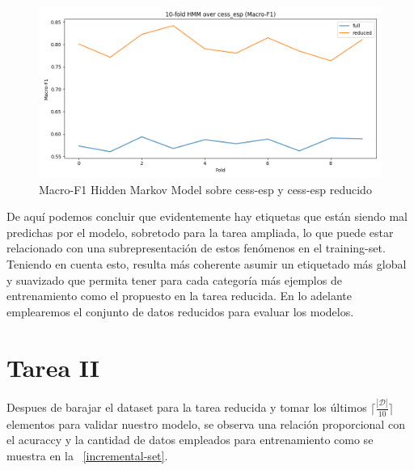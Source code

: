 \documentclass[11pt,a4paper]{report}
\begin{document}
	\begin{figure}[!thb]
		\begin{center}
			\includegraphics[scale=0.6]{images/macro-f1-hmm.png}
		\end{center}
		\caption{Macro-F1 Hidden Markov Model sobre cess-esp y cess-esp reducido}
		\label{macro-f1-hmm}
	\end{figure}

	De aquí podemos concluir que evidentemente hay etiquetas que están siendo mal predichas por el modelo, sobretodo para la tarea ampliada, lo que puede estar relacionado con una subrepresentación de estos fenómenos en el training-set. Teniendo en cuenta esto, resulta más coherente asumir un etiquetado más global y suavizado que permita tener para cada categoría más ejemplos de entrenamiento como el propuesto en la tarea reducida. En lo adelante emplearemos el conjunto de datos reducidos para evaluar los modelos.
	
	\section*{Tarea II}
	
	Despues de barajar el dataset para la tarea reducida y tomar los últimos $\Big\lceil \frac{|\mathcal{D}|}{10}\Big\rceil$ elementos para validar nuestro modelo, se observa una relación proporcional con el acuraccy y la cantidad de datos empleados para entrenamiento como se muestra en la \figurename~\ref{incremental-set}.
		
\end{document}
